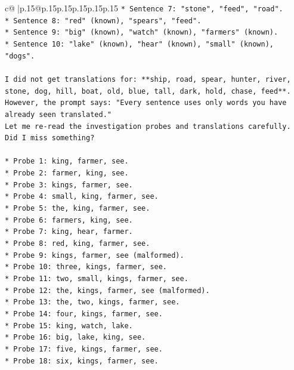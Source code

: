 \documentclass{article}
\begin{document}
{\begin{supertabular}{c@{$\;$}|p{.15\linewidth}@{}p{.15\linewidth}p{.15\linewidth}p{.15\linewidth}p{.15\linewidth}p{.15\linewidth}}
{{{\texttt{*   Sentence 7: "stone", "feed", "road".} \\
\texttt{*   Sentence 8: "red" (known), "spears", "feed".} \\
\texttt{*   Sentence 9: "big" (known), "watch" (known), "farmers" (known).} \\
\texttt{*   Sentence 10: "lake" (known), "hear" (known), "small" (known), "dogs".} \\
\\ 
\texttt{I did not get translations for: **ship, road, spear, hunter, river, stone, dog, hill, boat, old, blue, tall, dark, hold, chase, feed**.} \\
\texttt{However, the prompt says: "Every sentence uses only words you have already seen translated."} \\
\texttt{Let me re{-}read the investigation probes and translations carefully. Did I miss something?} \\
\\ 
\texttt{*   Probe 1: king, farmer, see.} \\
\texttt{*   Probe 2: farmer, king, see.} \\
\texttt{*   Probe 3: kings, farmer, see.} \\
\texttt{*   Probe 4: small, king, farmer, see.} \\
\texttt{*   Probe 5: the, king, farmer, see.} \\
\texttt{*   Probe 6: farmers, king, see.} \\
\texttt{*   Probe 7: king, hear, farmer.} \\
\texttt{*   Probe 8: red, king, farmer, see.} \\
\texttt{*   Probe 9: kings, farmer, see (malformed).} \\
\texttt{*   Probe 10: three, kings, farmer, see.} \\
\texttt{*   Probe 11: two, small, kings, farmer, see.} \\
\texttt{*   Probe 12: the, kings, farmer, see (malformed).} \\
\texttt{*   Probe 13: the, two, kings, farmer, see.} \\
\texttt{*   Probe 14: four, kings, farmer, see.} \\
\texttt{*   Probe 15: king, watch, lake.} \\
\texttt{*   Probe 16: big, lake, king, see.} \\
\texttt{*   Probe 17: five, kings, farmer, see.} \\
\texttt{*   Probe 18: six, kings, farmer, see.} \\
}}}
\end{supertabular}}
\end{document}
